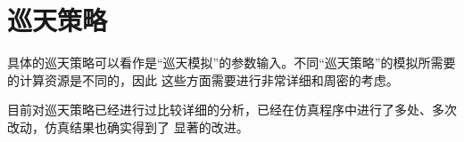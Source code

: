 
\chapter{巡天策略}

具体的巡天策略可以看作是“巡天模拟”的参数输入。不同“巡天策略”的模拟所需要的计算资源是不同的，因此
这些方面需要进行非常详细和周密的考虑。


目前对巡天策略已经进行过比较详细的分析，已经在仿真程序中进行了多处、多次改动，仿真结果也确实得到了
显著的改进。
